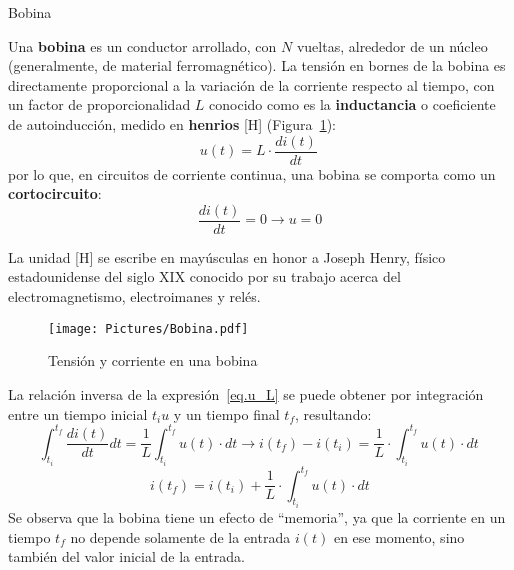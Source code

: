 \documentclass[11pt]{book} %
\makeatletter
\numberwithin{dummy}{section}
\theoremstyle{ocrenumbox}
\theoremstyle{blacknumex}
\theoremstyle{blacknumbox}
\theoremstyle{ocrenum}
\newenvironment{remark}{\par\vspace{10pt}\small %
\begin{list}{}{
\leftmargin=35pt %
\rightmargin=25pt}\item\ignorespaces %
\makebox[-2.5pt]{\begin{tikzpicture}[overlay]
\node[draw=ocre!60,line width=1pt,circle,fill=ocre!25,font=\sffamily\bfseries,inner sep=2pt,outer sep=0pt] at (-15pt,0pt){\textcolor{ocre}{N}};\end{tikzpicture}} %
\advance\baselineskip -1pt}{\end{list}\vskip5pt} %
\renewcommand{\subsubsection}{\@startsection {subsubsection}{3}{\z@}
{-2ex \@plus -0.1ex \@minus -.2ex}
{.2ex \@plus.2ex }
{\normalfont\small\sffamily\bfseries}}
\newlength\esp
\makeatother
\begin{document}
	\subsubsection{Bobina}\label{sec.bobina}
	
	Una \textbf{bobina} es un conductor arrollado, con $N$ vueltas, alrededor de un núcleo (generalmente, de material ferromagnético). La tensión en bornes de la bobina es directamente proporcional a la variación de la corriente respecto al tiempo, con un factor de proporcionalidad $L$ conocido como es la \textbf{inductancia} o coeficiente de autoinducción, medido en \textbf{henrios} [H] (Figura~\ref{fig.bobina}):
	\begin{equation}\label{eq.u_L}
		\boxed{u(t)=L\cdot\frac{di(t)}{dt}}\,
	\end{equation}
	por lo que, en circuitos de corriente continua, una bobina se comporta como un \textbf{cortocircuito}:
	\begin{equation*}
		\dfrac{di(t)}{dt} = 0 \rightarrow u = 0
	\end{equation*}
	\begin{remark}
		La unidad [H] se escribe en mayúsculas en honor a Joseph Henry, físico estadounidense del siglo XIX conocido por su trabajo acerca del electromagnetismo, electroimanes y relés.
	\end{remark}
	\begin{figure}[htbp]
		\centering
		\texttt{[image: Pictures/Bobina.pdf]}
		\caption{Tensión y corriente en una bobina}
		\label{fig.bobina}
	\end{figure}
	
	La relación inversa de la expresión~\eqref{eq.u_L} se puede obtener por integración entre un tiempo inicial $t_iu$ y un tiempo final $t_f$, resultando:
	\begin{equation*}
		\int_{t_i}^{t_f} \dfrac{di(t)}{dt}dt=\dfrac{1}{L}\int_{t_i}^{t_f}u(t)\cdot dt \rightarrow i(t_f)-i(t_i)=\dfrac{1}{L}\cdot\int_{t_i}^{t_f} u(t)\cdot dt\,
	\end{equation*}
	\begin{equation}
		\boxed{i(t_f)=i(t_i)+\dfrac{1}{L}\cdot\int_{t_i}^{t_f} u(t)\cdot dt}
	\end{equation}
	Se observa que la bobina tiene un efecto de ``memoria'', ya que la corriente en un tiempo $t_f$ no depende solamente de la entrada $i(t)$ en ese momento, sino también del valor inicial de la entrada.
	
\end{document}

